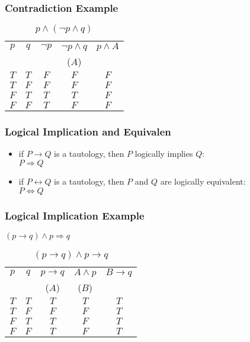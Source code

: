 \documentclass[dvipsnames]{beamer}
\begin{document}
\begin{frame}
  \frametitle{Contradiction Example}

  \begin{table}
    \caption{$p \wedge (\neg p \wedge q)$}
    \begin{tabular}{|c|c|c|c||c|}\hline
      $p$ & $q$ & $\neg p$ & $\neg p \wedge q$ & $p \wedge A$\\
          &     &          & ($A$)             &\\\hline\hline
      $T$ & $T$ & $F$ & $F$ & $F$\\\hline
      $T$ & $F$ & $F$ & $F$ & $F$\\\hline
      $F$ & $T$ & $T$ & $T$ & $F$\\\hline
      $F$ & $F$ & $T$ & $F$ & $F$\\\hline
    \end{tabular}
  \end{table}
\end{frame}

\begin{frame}
  \frametitle{Logical Implication and Equivalen}

  \begin{itemize}
    \item if $P \rightarrow Q$ is a tautology,
      then $P$ \alert{logically implies} $Q$:\\
      $P \Rightarrow Q$

    \pause
    \medskip
    \item if $P \leftrightarrow Q$ is a tautology,
      then $P$ and $Q$ are \alert{logically equivalent}:\\
      $P \Leftrightarrow Q$
  \end{itemize}
\end{frame}

\begin{frame}
  \frametitle{Logical Implication Example}

  $(p \rightarrow q) \wedge p \Rightarrow q$

  \begin{table}
    \caption{$(p \rightarrow q) \wedge p \rightarrow q$}
    \begin{tabular}{|c|c|c|c||c|}\hline
      $p$ & $q$ & $p \rightarrow q$ & $A \wedge p$ & $B \rightarrow q$\\
          &     & ($A$)             & ($B$)        &\\\hline\hline
      $T$ & $T$ & $T$ & $T$ & $T$\\\hline
      $T$ & $F$ & $F$ & $F$ & $T$\\\hline
      $F$ & $T$ & $T$ & $F$ & $T$\\\hline
      $F$ & $F$ & $T$ & $F$ & $T$\\\hline
    \end{tabular}
  \end{table}
\end{frame}
\end{document}
